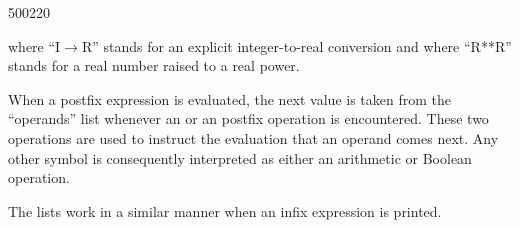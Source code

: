 \startfig
\begin{fast_picture}{500}{220}
\savFboxpos
{}
         \putboxafterarrow
             \boxtoright{}\boxtoright{}\boxtoright
             \boxtoright{}\boxtoright\valbox{*}\boxtoright
             \valbox{$-$}\boxtoright{}\boxtoright{}\boxtoright
             \boxtoright{}\boxtoright\valbox{/}\boxtoright
             \valbox{$+$}
\nextFbox{}
         \putboxafterarrow
             \boxtoright\valbox{$+$}\boxtoright\valbox{(}\boxtoright
             \boxtoright\valbox{$-$}\boxtoright{}\boxtoright
             \valbox{*}\boxtoright{}\boxtoright\valbox{)}\boxtoright
             \valbox{/}\boxtoright{}\boxtoright\valbox{**}\boxtoright
\nextFbox{}
         \stackDboxtoright
         \nextDbox\valbox{}
         \nextDbox\valbox{}
         \nextDbox\valbox{}
         \nextDbox\valbox{}
         \nextDbox\valbox{}
         \nextDbox\valbox{}
\nextFbox{}
\nextFbox{}
\nextFbox{}
\nextFbox{}
\nextFbox{}
\nextFbox{}
\end{fast_picture}

where ``I$\rightarrow$R'' stands for an explicit integer-to-real conversion
and where ``R**R'' stands for a real number raised to a real power.

When a postfix expression is evaluated, the next value is taken from the
``operands'' list whenever an  or an 
postfix operation is encountered.  These two operations are
used to instruct the evaluation that an operand comes next.  Any other
symbol is consequently interpreted as either an arithmetic or Boolean
operation.

The lists work in a similar manner when an infix expression is printed.

